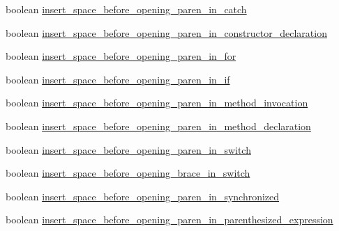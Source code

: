 \begin{DoxyCompactItemize}
\item 
boolean \hyperlink{classorg_1_1eclipse_1_1jdt_1_1ui_1_1tests_1_1refactoring_1_1infra_1_1TestFormatterOptions_ab9863eb2ae340222e62edeb0cc9118b6}{insert\_\-space\_\-before\_\-opening\_\-paren\_\-in\_\-catch}
\item 
boolean \hyperlink{classorg_1_1eclipse_1_1jdt_1_1ui_1_1tests_1_1refactoring_1_1infra_1_1TestFormatterOptions_aa7b17c83c60c620f92a564d6ddd0a706}{insert\_\-space\_\-before\_\-opening\_\-paren\_\-in\_\-constructor\_\-declaration}
\item 
boolean \hyperlink{classorg_1_1eclipse_1_1jdt_1_1ui_1_1tests_1_1refactoring_1_1infra_1_1TestFormatterOptions_a7eb1a665d60754ab58837b41d58a1d58}{insert\_\-space\_\-before\_\-opening\_\-paren\_\-in\_\-for}
\item 
boolean \hyperlink{classorg_1_1eclipse_1_1jdt_1_1ui_1_1tests_1_1refactoring_1_1infra_1_1TestFormatterOptions_a0330b100b89e968ed643e78ef91f547f}{insert\_\-space\_\-before\_\-opening\_\-paren\_\-in\_\-if}
\item 
boolean \hyperlink{classorg_1_1eclipse_1_1jdt_1_1ui_1_1tests_1_1refactoring_1_1infra_1_1TestFormatterOptions_a633e406f2782c4bdd8772df9524c91ce}{insert\_\-space\_\-before\_\-opening\_\-paren\_\-in\_\-method\_\-invocation}
\item 
boolean \hyperlink{classorg_1_1eclipse_1_1jdt_1_1ui_1_1tests_1_1refactoring_1_1infra_1_1TestFormatterOptions_a480ee87be1b6459f8413f0ea706968cc}{insert\_\-space\_\-before\_\-opening\_\-paren\_\-in\_\-method\_\-declaration}
\item 
boolean \hyperlink{classorg_1_1eclipse_1_1jdt_1_1ui_1_1tests_1_1refactoring_1_1infra_1_1TestFormatterOptions_a6283e23778e8806e5e5670e8e24401ad}{insert\_\-space\_\-before\_\-opening\_\-paren\_\-in\_\-switch}
\item 
boolean \hyperlink{classorg_1_1eclipse_1_1jdt_1_1ui_1_1tests_1_1refactoring_1_1infra_1_1TestFormatterOptions_afc83ae9e11f733039f3d90c94bb375aa}{insert\_\-space\_\-before\_\-opening\_\-brace\_\-in\_\-switch}
\item 
boolean \hyperlink{classorg_1_1eclipse_1_1jdt_1_1ui_1_1tests_1_1refactoring_1_1infra_1_1TestFormatterOptions_aad8427d4d2c3861aad64c1551721d1f7}{insert\_\-space\_\-before\_\-opening\_\-paren\_\-in\_\-synchronized}
\item 
boolean \hyperlink{classorg_1_1eclipse_1_1jdt_1_1ui_1_1tests_1_1refactoring_1_1infra_1_1TestFormatterOptions_aad4bd89f83a3fb40fa12a603d19d646f}{insert\_\-space\_\-before\_\-opening\_\-paren\_\-in\_\-parenthesized\_\-expression}

\end{DoxyCompactItemize}
